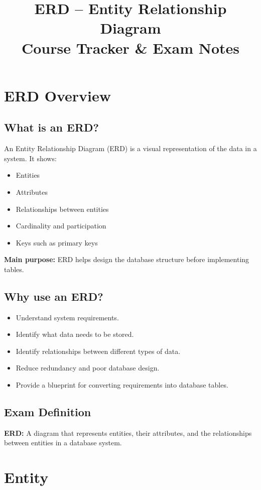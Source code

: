\documentclass[12pt,a4paper]{article}
\title{\textbf{ERD -- Entity Relationship Diagram}\\
\large Course Tracker \& Exam Notes}
\author{}
\date{}
\begin{document}
\maketitle
\tableofcontents
\newpage

\section{ERD Overview}

\subsection{What is an ERD?}
An Entity Relationship Diagram (ERD) is a visual representation of the data in a system. It shows:
\begin{itemize}
\item Entities
\item Attributes
\item Relationships between entities
\item Cardinality and participation
\item Keys such as primary keys
\end{itemize}

\textbf{Main purpose:} ERD helps design the database structure before implementing tables.

\subsection{Why use an ERD?}
\begin{itemize}
\item Understand system requirements.
\item Identify what data needs to be stored.
\item Identify relationships between different types of data.
\item Reduce redundancy and poor database design.
\item Provide a blueprint for converting requirements into database tables.
\end{itemize}

\subsection{Exam Definition}
\textbf{ERD:} A diagram that represents entities, their attributes, and the relationships between entities in a database system.

\section{Entity}
\end{document}
